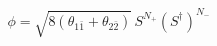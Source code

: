 \begin{equation}\label{eq:ap}
 \phi=\sqrt{8(\theta_{1\bar{1}}+\theta_{2\bar{2}})}\,S^{N_+}
 (S^\dagger)^{N_-}
\end{equation}


